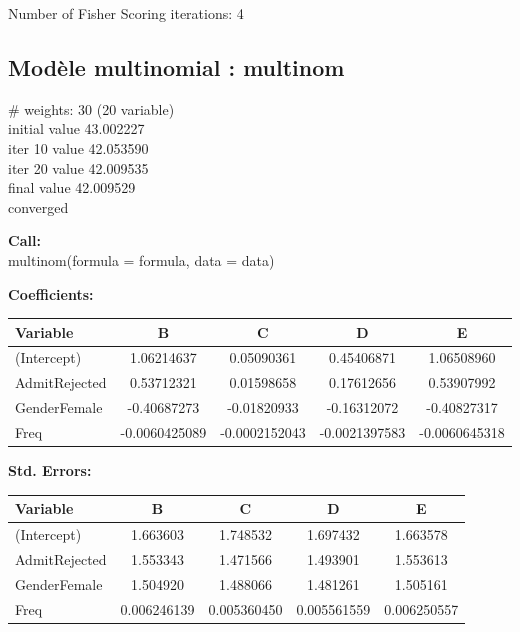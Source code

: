 \documentclass[10pt,french]{report}
\begin{document}
    \begin{flushleft}
    Number of Fisher Scoring iterations: 4
    \end{flushleft}

    \subsection{Modèle multinomial : multinom}

    \begin{flushleft}
    \# weights: 30 (20 variable) \\
    initial value 43.002227 \\
    iter 10 value 42.053590 \\
    iter 20 value 42.009535 \\
    final value 42.009529 \\
    converged
    \end{flushleft}

    \begin{flushleft}
    \textbf{Call:} \\
    multinom(formula = formula, data = data)
    \end{flushleft}

    \begin{flushleft}
    \textbf{Coefficients:}
    \end{flushleft}

    \begin{longtable}{lcccc}
    \hline
    \textbf{Variable} & \textbf{B} & \textbf{C} & \textbf{D} & \textbf{E} \\
    \hline
    \endfirsthead
    \hline
    (Intercept) & 1.06214637 & 0.05090361 & 0.45406871 & 1.06508960 \\
    AdmitRejected & 0.53712321 & 0.01598658 & 0.17612656 & 0.53907992 \\
    GenderFemale & -0.40687273 & -0.01820933 & -0.16312072 & -0.40827317 \\
    Freq & -0.0060425089 & -0.0002152043 & -0.0021397583 & -0.0060645318 \\
    \hline
    \end{longtable}

    \begin{flushleft}
    \textbf{Std. Errors:}
    \end{flushleft}

    \begin{longtable}{lcccc}
    \hline
    \textbf{Variable} & \textbf{B} & \textbf{C} & \textbf{D} & \textbf{E} \\
    \hline
    \endfirsthead
    \hline
    (Intercept) & 1.663603 & 1.748532 & 1.697432 & 1.663578 \\
    AdmitRejected & 1.553343 & 1.471566 & 1.493901 & 1.553613 \\
    GenderFemale & 1.504920 & 1.488066 & 1.481261 & 1.505161 \\
    Freq & 0.006246139 & 0.005360450 & 0.005561559 & 0.006250557 \\
    \hline
    \end{longtable}
\end{document}
